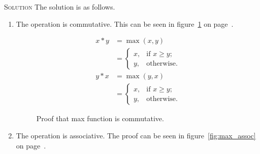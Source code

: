 \documentclass[draft,twoside]{amsart}
\newcommand{\Solution}{\textsc{Solution}\xspace}
\begin{document}
\begin{enumerate}
   \noindent \Solution The solution is as follows.

   \begin{enumerate}
      
      \item The operation is commutative. This can be seen in 
      figure~\ref{fig:max_com} on page~\pageref{fig:max_com}.

      \begin{figure}
      \caption{Proof that max function is commutative.}
      \label{fig:max_com}
      \begin{align*}
         x * y & = \max(x,y)    \\
	       & =
	       \begin{cases}
	          x,       & \text{if $x \ge y$;} \\
		  y,       & \text{otherwise.}
	       \end{cases} \\
	 y * x & = \max(y,x)   \\
	       & =
	       \begin{cases}
	          x,       & \text{if $x \ge y$;} \\
		  y,       & \text{otherwise.}
	       \end{cases}
      \end{align*}
      \end{figure}

      \item The operation is associative. The proof can be seen in
      figure~\ref{fig:max_assoc} on page~\pageref{fig:max_assoc}.


\end{enumerate}
\end{enumerate}
\end{document}
